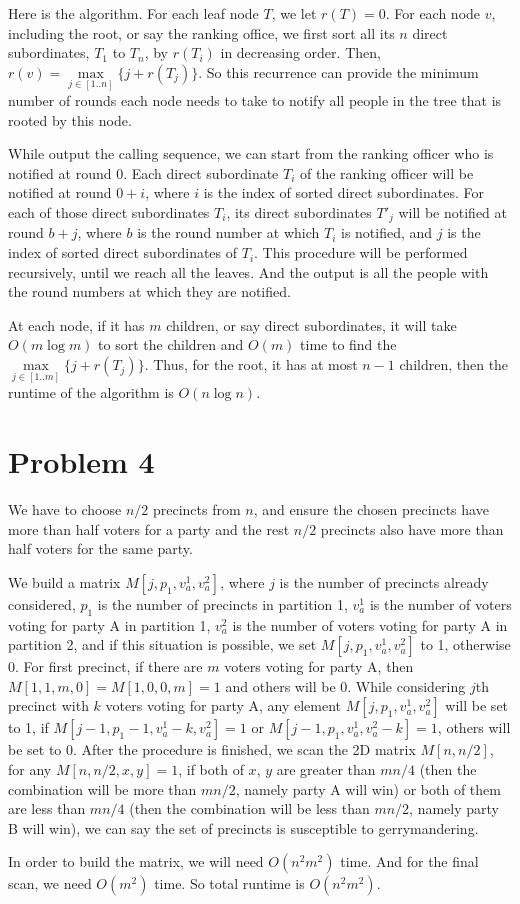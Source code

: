 \documentclass[letter,12pt]{article}
\begin{document}
Here is the algorithm. For each leaf node $T$, we let $r(T) = 0$. For each
node $v$, including the root, or say the ranking office, we first sort all its  
$n$ direct subordinates, $T_1$ to $T_n$, by $r(T_i)$ in decreasing order. 
Then, $r(v) = \max\limits_{j \in [1..n]}\{j+r(T_j)\}$. So this recurrence can 
provide the minimum number of rounds each node needs to take to notify
all people in the tree that is rooted by this node.

While output the calling sequence, we can start from the ranking officer who
is notified at round 0. Each direct subordinate $T_i$ of the ranking officer 
will be notified at round $0+i$, where $i$ is the index of sorted direct 
subordinates. For each of those direct subordinates $T_i$, its direct 
subordinates $T'_j$ will be notified at round $b+j$, where $b$ is the round 
number at which $T_i$ is notified, and $j$ is the index of sorted direct 
subordinates of $T_i$. This procedure will be performed recursively, until
we reach all the leaves. And the output is all the people with the round
numbers at which they are notified.

At each node, if it has $m$ children, or say direct subordinates, it will take
$O(m\log m)$ to sort the children and $O(m)$ time to find the 
$\max\limits_{j \in [1..m]}\{j+r(T_j)\}$. Thus, for the root, it has at most
$n-1$ children, then the runtime of the algorithm is $O(n\log n)$.

\section*{Problem 4}
We have to choose $n/2$ precincts
from $n$, and ensure the chosen precincts have more than half voters for
a party and the rest $n/2$ precincts also have more than half voters for
the same party. 

We build a matrix $M[j, p_1, v_a^1, v_a^2]$, where $j$ is the number of
precincts already considered, $p_1$ is the number of precincts in partition
1, $v_a^1$ is the number of voters voting for party A in partition 1,  
$v_a^2$ is the number of voters voting for party A in partition 2, and if
this situation is possible, we set $M[j, p_1, v_a^1, v_a^2]$ to 1, otherwise
0. For first precinct, if there are $m$ voters voting for party A, then 
$M[1, 1, m, 0]=M[1, 0, 0, m] = 1$ and others will be 0. While considering
$j$th precinct with $k$ voters voting for party A, any element 
$M[j, p_1, v_a^1, v_a^2]$ will be set to 1, if $M[j-1, p_1-1,v_a^1-k, 
v_a^2]=1$ or $M[j-1,p_1, v_a^1,v_a^2-k]=1$, others will be set to 0.
After the procedure is finished, we scan the 2D matrix $M[n,n/2]$, for any
$M[n,n/2, x, y] = 1$, if both of $x$, $y$ are greater than $mn/4$ 
(then the combination will be more than $mn/2$, namely party A will win) or 
both of them are less than $mn/4$ (then the combination will be less than 
$mn/2$, namely party B will win), we can say the set of precincts is 
susceptible to gerrymandering.

In order to build the matrix, we will need $O(n^2m^2)$ time. And for the
final scan, we need $O(m^2)$ time. So total runtime is $O(n^2m^2)$.
\end{document}

